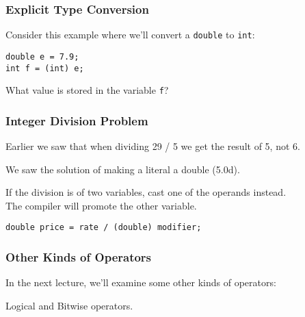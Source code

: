\begin{frame}[fragile]
\frametitle{Explicit Type Conversion}

Consider this example where we'll convert a \texttt{double} to \texttt{int}:

\begin{verbatim}
double e = 7.9;
int f = (int) e;
\end{verbatim}

What value is stored in the variable \texttt{f}?

\end{frame}

\begin{frame}
\frametitle{Integer Division Problem}
Earlier we saw that when dividing 29 / 5 we get the result of 5, not 6.

We saw the solution of making a literal a double (5.0d).

If the division is of two variables, cast one of the operands instead.\\
\quad The compiler will promote the other variable.

\texttt{double price = rate / (double) modifier;}

\end{frame}

\begin{frame}
\frametitle{Other Kinds of Operators}

In the next lecture, we'll examine some other kinds of operators:

Logical and Bitwise operators.

\end{frame}




